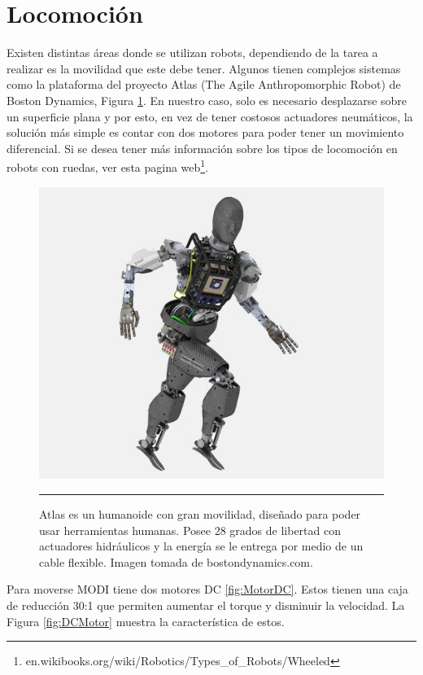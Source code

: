 
\section{Locomoción}
Existen distintas áreas donde se utilizan robots, dependiendo de la tarea a realizar es la movilidad que este debe tener. Algunos tienen complejos sistemas como la plataforma del proyecto Atlas (The Agile Anthropomorphic Robot) de Boston Dynamics, Figura \ref{fig:Atlas}. En nuestro caso, solo es necesario desplazarse sobre un superficie plana y por esto, en vez de tener costosos actuadores neumáticos, la solución más simple es contar con dos motores para poder tener un movimiento diferencial. Si se desea tener más información sobre los tipos de locomoción en robots con ruedas, ver esta pagina web\footnote{en.wikibooks.org/wiki/Robotics/Types\_of\_Robots/Wheeled}.


\begin{figure}[htbp]
	\centering
		\includegraphics[width=\textwidth]{./Figures/AtlasCADlr.jpg}
		\rule{35em}{0.5pt}
	\caption[Robot Atlas]{Atlas es un humanoide con gran movilidad, diseñado para poder usar herramientas humanas. Posee 28 grados de libertad con actuadores hidráulicos y la energía se le entrega por medio de un cable flexible. Imagen tomada de bostondynamics.com.}
	\label{fig:Atlas}
\end{figure}


Para moverse MODI tiene dos motores DC \ref{fig:MotorDC}. Estos tienen una caja de reducción 30:1 que permiten aumentar el torque y disminuir la velocidad. La Figura \ref{fig:DCMotor} muestra la característica de estos. 

